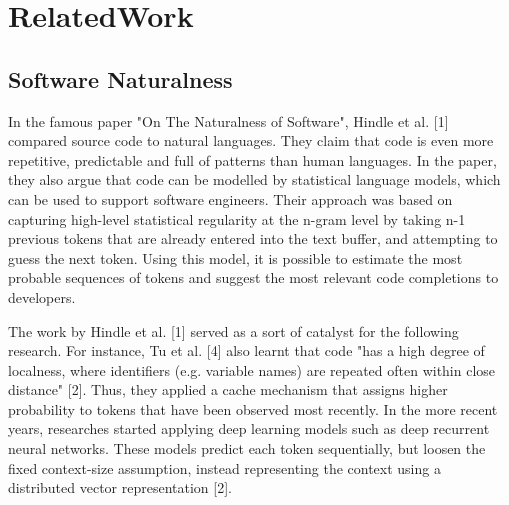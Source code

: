 \chapter{RelatedWork}
\label{chap:RelatedWork}

\section{Software Naturalness}
In the famous paper "On The Naturalness of Software", Hindle et al. [1] compared source code
to natural languages. They claim that code is even more repetitive, predictable and full of
patterns than human languages. In the paper, they also argue that code can be modelled by
statistical language models, which can be used to support software engineers. Their approach
was based on capturing high-level statistical regularity at the n-gram level by taking n-1
previous tokens that are already entered into the text buffer, and attempting to guess the
next token. Using this model, it is possible to estimate the most probable sequences of tokens
and suggest the most relevant code completions to developers.

The work by Hindle et al. [1] served as a sort of catalyst for the following research. For
instance, Tu et al. [4] also learnt that code "has a high degree of localness, where identifiers
(e.g. variable names) are repeated often within close distance" [2]. Thus, they applied a cache
mechanism that assigns higher probability to tokens that have been observed most recently. In the
more recent years, researches started applying deep learning models such as deep recurrent
neural networks. These models predict each token sequentially, but loosen the fixed context-size
assumption, instead representing the context using a distributed vector representation [2].

